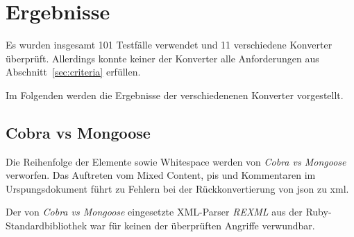 \chapter{Ergebnisse} \label{chap:results}

\begin{figure}[b!]
    
    \label{tbl:results-basic}
\end{figure}

\begin{figure}[t!]
    
    \label{tbl:results-chars}
\end{figure}

\begin{figure}[t!]
    
    \label{tbl:results-complex}
\end{figure}

\begin{figure}[t!]
    
    \label{tbl:results-sec}
\end{figure}

Es wurden insgesamt 101 Testfälle verwendet und 11 verschiedene Konverter überprüft. Allerdings konnte keiner der Konverter alle Anforderungen aus Abschnitt~\ref{sec:criteria} erfüllen.

Im Folgenden werden die Ergebnisse der verschiedenenen Konverter vorgestellt.

\section{Cobra vs Mongoose}
\label{sec:cobravsmongoose}

Die Reihenfolge der Elemente sowie Whitespace werden von \emph{Cobra vs Mongoose} verworfen. Das Auftreten vom Mixed Content, \glspl{pi} und Kommentaren im Urspungsdokument führt zu Fehlern bei der Rückkonvertierung von \acrshort{json} zu \acrshort{xml}.

Der von \emph{Cobra vs Mongoose} eingesetzte XML-Parser \emph{REXML} aus der Ruby-Standardbibliothek war für keinen der überprüften Angriffe verwundbar.

